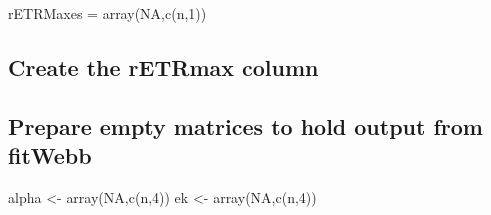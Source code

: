 \documentclass[
]{article}
\newenvironment{Shaded}{\begin{snugshade}}{\end{snugshade}}
\newcommand{\CommentTok}[1]{\textcolor[rgb]{0.56,0.35,0.01}{\textit{#1}}}
\newcommand{\ConstantTok}[1]{\textcolor[rgb]{0.00,0.00,0.00}{#1}}
\newcommand{\ControlFlowTok}[1]{\textcolor[rgb]{0.13,0.29,0.53}{\textbf{#1}}}
\newcommand{\DecValTok}[1]{\textcolor[rgb]{0.00,0.00,0.81}{#1}}
\newcommand{\FunctionTok}[1]{\textcolor[rgb]{0.00,0.00,0.00}{#1}}
\newcommand{\NormalTok}[1]{#1}
\newcommand{\OtherTok}[1]{\textcolor[rgb]{0.56,0.35,0.01}{#1}}
\newcommand{\SpecialCharTok}[1]{\textcolor[rgb]{0.00,0.00,0.00}{#1}}
\begin{document}
\begin{Shaded}
\begin{Highlighting}[]
\NormalTok{rETRMaxes }\OtherTok{=} \FunctionTok{array}\NormalTok{(}\ConstantTok{NA}\NormalTok{,}\FunctionTok{c}\NormalTok{(n,}\DecValTok{1}\NormalTok{))}
\end{Highlighting}
\end{Shaded}

\hypertarget{create-the-retrmax-column}{%
\subsection{Create the rETRmax column}\label{create-the-retrmax-column}}

\begin{Shaded}
\end{Shaded}

\hypertarget{prepare-empty-matrices-to-hold-output-from-fitwebb}{%
\subsection{Prepare empty matrices to hold output from
fitWebb}\label{prepare-empty-matrices-to-hold-output-from-fitwebb}}

\begin{Shaded}
\begin{Highlighting}[]
\NormalTok{alpha }\OtherTok{\textless{}{-}} \FunctionTok{array}\NormalTok{(}\ConstantTok{NA}\NormalTok{,}\FunctionTok{c}\NormalTok{(n,}\DecValTok{4}\NormalTok{))}
\NormalTok{ek }\OtherTok{\textless{}{-}} \FunctionTok{array}\NormalTok{(}\ConstantTok{NA}\NormalTok{,}\FunctionTok{c}\NormalTok{(n,}\DecValTok{4}\NormalTok{))}
\end{Highlighting}
\end{Shaded}
\end{document}
